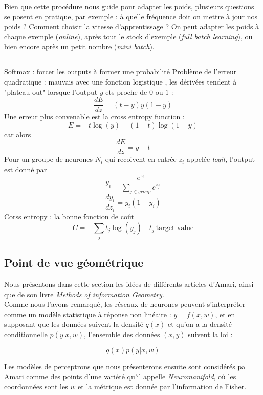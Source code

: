 \documentclass{article}
\begin{document}
Bien que cette procédure nous guide pour adapter les poids, plusieurs questions se posent en pratique, par exemple : à quelle fréquence doit on mettre à jour nos poids ? Comment choisir la vitesse d'apprentissage ? On peut adapter les poids à chaque exemple (\textit{online}), après tout le stock d'exemple (\textit{full batch learning}), ou bien encore après un petit nombre (\textit{mini batch}).\\

\subsection{}
Softmax : forcer les outputs à former une probabilité
Problème de l'erreur quadratique : mauvais avec une fonction logistique , les dérivées tendent à "plateau out" lorsque l'output $y$ ets proche de $0$ ou $1$ : 
\[\frac{dE}{dz}=(t-y)y(1-y)\]
Une erreur plus convenable est la cross entropy function :
\[E=-t\log(y)-(1-t)\log(1-y)\] 
car alors \[\frac{dE}{dz}=y-t\]
Pour un groupe de neurones $N_i$ qui recoivent en entrée $z_i$ appelée \textit{logit}, l'output est donné par 
\[y_i=\frac{e^{z_i}}{\sum_{j\in group} e^{z_j}}\]
\[\frac{dy_i}{dz_i}=y_i(1-y_i)\]
Corss entropy : la bonne fonction de coût \[C=-\sum_j t_j \log(y_j)\quad t_j \ \text{target value}\]

\subsection{Point de vue géométrique}

Nous présentons dans cette section les idées de différents articles d'Amari, ainsi que de son livre \textit{Methods of information Geometry}.\\

Comme nous l'avons remarqué, les réseaux de neurones peuvent s'interpréter comme un modèle statistique à réponse non linéaire : $y=f(x,w)$, et en supposant que les données suivent la densité $q(x)$ et qu'on a la densité conditionnelle $p(y|x,w)$, l'ensemble des données $(x,y)$ suivent la loi :

\[q(x)p(y|x,w)\]

Les modèles de perceptrons que nous présenterons ensuite sont considérés pa Amari comme des points d'une variété qu'il appelle \textit{Neuromanifold}, où les coordonnées sont les $w$ et la métrique est donnée par l'information de Fisher.\\
\end{document}
